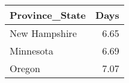 \begin{tabular}{lr}
\toprule
Province\_State &  Days \\
\midrule
 New Hampshire &  6.65 \\
     Minnesota &  6.69 \\
        Oregon &  7.07 \\
\bottomrule
\end{tabular}
